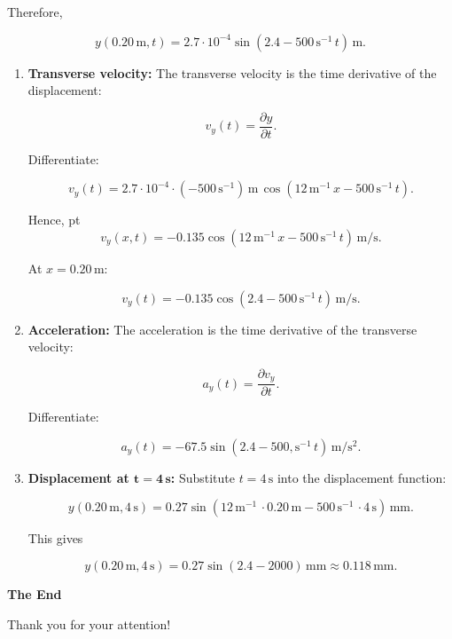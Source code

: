 \documentclass[t,aspectratio=169]{beamer}
\begin{document}
\begin{frame}
\begin{enumerate}
\pagebreak
Therefore,

$$y(0.20\,\mathrm{m},t)=2.7\cdot10^{-4}\sin(2.4-500\,\mathrm{s^{-1}}\,t)\,\mathrm{m}.$$

\begin{enumerate}
\item[(a)] \textbf{Transverse velocity:} The transverse velocity is the time derivative of the displacement:

$$v_y(t)=\frac{\partial y}{\partial t}.$$

Differentiate:

$$v_y(t)=2.7\cdot10^{-4}\cdot(-500\,\mathrm{s^{-1}})\,\mathrm{m}\,\cos(12\,\mathrm{m^{-1}}\,x-500\,\mathrm{s^{-1}}\,t).$$

Hence,
 pt
$$v_y(x,t)=-0.135\cos(12\,\mathrm{m^{-1}}\,x-500\,\mathrm{s^{-1}}\,t)\,\mathrm{m/s}.$$

\pagebreak
At $x=0.20\,\mathrm{m}$:

$$\boxed{v_y(t)=-0.135\cos(2.4-500\,\mathrm{s^{-1}}\,t)\,\mathrm{m/s}}.$$

\item[(b)] \textbf{Acceleration:} The acceleration is the time derivative of the transverse velocity:

$$a_y(t)=\frac{\partial v_y}{\partial t}.$$

Differentiate:

$$\boxed{a_y(t)=-67.5\sin(2.4-500,\mathrm{s^{-1}}\,t)\,\mathrm{m/s^2}}.$$

\item[(c)] \textbf{Displacement at $\mathbf{t=4\,\mathrm{\mathbf{s}}}$:} Substitute $t=4\,\mathrm{s}$ into the displacement function:

$$y(0.20\,\mathrm{m},4\,\mathrm{s})=0.27\sin(12\,\mathrm{m^{-1}}\,\cdot0.20\,\mathrm{m}-500\,\mathrm{s^{-1}}\,\cdot4\,\mathrm{s})\,\mathrm{mm}.$$

This gives

$$y(0.20\,\mathrm{m},4\,\mathrm{s})=0.27\sin(2.4-2000)\,\mathrm{mm}\approx\boxed{0.118\,\mathrm{mm}}.$$

\end{enumerate}

\end{enumerate}

\end{frame}


\begin{frame}

\vfill
\begin{center}
\textbf{\huge The End}

\bigskip
Thank you for your attention!
\end{center}
\vfill
\end{frame}
\end{document}
